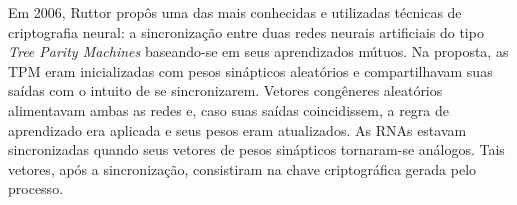\documentclass[12pt]{article}
\begin{document}
        
        Em 2006, Ruttor \cite{ruttor2007neural} propôs uma das mais conhecidas e utilizadas técnicas de criptografia neural: a sincronização entre duas redes neurais artificiais do tipo \textit{Tree Parity Machines} baseando-se em seus aprendizados mútuos. Na proposta, as TPM eram inicializadas com pesos sinápticos aleatórios e compartilhavam suas saídas com o intuito de se sincronizarem. Vetores congêneres aleatórios alimentavam ambas as redes e, caso suas saídas coincidissem, a regra de aprendizado era aplicada e seus pesos eram atualizados. As RNAs estavam sincronizadas quando seus vetores de pesos sinápticos tornaram-se análogos. Tais vetores, após a sincronização, consistiram na chave criptográfica gerada pelo processo.
        
    
\end{document}
